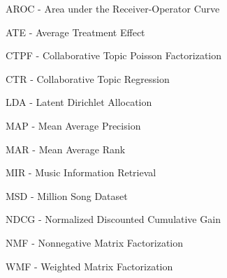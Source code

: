 AROC - Area under the Receiver-Operator Curve

ATE - Average Treatment Effect

CTPF - Collaborative Topic Poisson Factorization

CTR - Collaborative Topic Regression

LDA - Latent Dirichlet Allocation

MAP - Mean Average Precision

MAR - Mean Average Rank

MIR - Music Information Retrieval

MSD - Million Song Dataset

NDCG - Normalized Discounted Cumulative Gain

NMF - Nonnegative Matrix Factorization

WMF - Weighted Matrix Factorization
